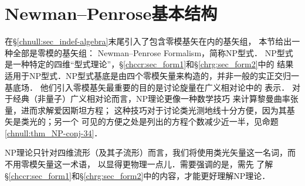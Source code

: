 \section{Newman--Penrose基本结构}\label{chnull:sec_NP1}
在\S\ref{chnull:sec_indef-algebra}末尾引入了包含零模基矢在内的基矢组，
本节给出一种全部是零模的基矢组：
Newman--Penrose Formalism\cite{newman-Penrose-1962}，简称NP型式．
NP型式是一种特定的四维“型式理论”，\S\ref{chccr:sec_form1}和\S\ref{chrg:sec_form2}中的
结果适用于NP型式．NP型式基底是由四个零模矢量来构造的，并非一般的实正交归一基底场．
他们引入零模基矢最重要的目的是讨论{\kaishu 旋量}在广义相对论中的
表示\cite{penrose-Rindler1984,penrose-Rindler1986}．
对于经典（非量子）广义相对论而言，NP理论更像一种数学技巧
来计算黎曼曲率张量，进而求解爱因斯坦方程；
这种技巧对于讨论类光测地线十分方便，因为其基矢是类光的；另一个
可见的方便之处是列出的方程个数减少近一半，见命题\ref{chnull:thm_NP-conj-34}．


NP理论只针对四维流形（及其子流形）而言，我们将使用类光矢量这一名词，而不用零模矢量这一术语，
以显得更物理一点儿．需要强调的是，需先
了解\S\ref{chccr:sec_form1}和\S\ref{chrg:sec_form2}中的内容，才能更好理解NP理论．


